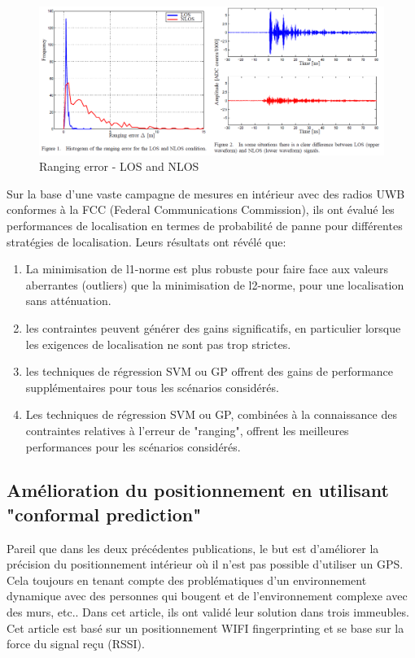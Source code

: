 \begin{figure}[htp]
 \begin{center}
  \includegraphics[scale=0.6]{figures/LosNlos.png}
  \caption{Ranging error - LOS and NLOS \cite{ML_UWB}}
  \label{fig:LosNlos} %
 \end{center}
\end{figure}

Sur la base d'une vaste campagne de mesures en intérieur avec des radios UWB conformes à la FCC (Federal Communications Commission), ils ont évalué les performances de localisation en termes de probabilité de panne pour différentes stratégies de localisation. Leurs résultats ont révélé que: 

\begin{enumerate}
 \item La minimisation de l1-norme est plus robuste pour faire face aux valeurs aberrantes (outliers) que la minimisation de l2-norme, pour une localisation sans atténuation.
 \item les contraintes peuvent générer des gains significatifs, en particulier lorsque les exigences de localisation ne sont pas trop strictes.
 \item les techniques de régression SVM ou GP offrent des gains de performance supplémentaires pour tous les scénarios considérés.
 \item Les techniques de régression SVM ou GP, combinées à la connaissance des contraintes relatives à l'erreur de "ranging", offrent les meilleures performances pour les scénarios considérés.
\end{enumerate}

\subsection{Amélioration du positionnement en utilisant "conformal prediction" \cite{CP_RSS}}
Pareil que dans les deux précédentes publications, le but est d'améliorer la précision du positionnement intérieur où il n'est pas possible d'utiliser un GPS. Cela toujours en tenant compte des problématiques d'un environnement dynamique avec des personnes qui bougent et de l'environnement complexe avec des murs, etc.. Dans cet article, ils ont validé leur solution dans trois immeubles. Cet article est basé sur un positionnement WIFI fingerprinting et se base sur la force du signal reçu (RSSI).

